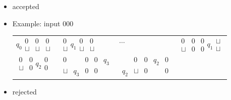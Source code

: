 \begin{frame}[allowframebreaks]
\begin{itemize}
\item [] accepted
  
\item Example: input 000

\renewcommand{\arraystretch}{1.7}  
  \begin{tabular}{llll}
$ q_0
\begin{smallmatrix}
  0 &0 & 0 \\
  \sqcup & \sqcup & \sqcup 
\end{smallmatrix}
$
&
$
\begin{smallmatrix}
  0 \\
  \sqcup 
\end{smallmatrix}
q_1
\begin{smallmatrix}
  0 & 0  \\
  \sqcup & \sqcup 
\end{smallmatrix}
$
&           
$\cdots
$
&
$
\begin{smallmatrix}
  0 & 0 & 0 \\
  \sqcup & 0  & 0 
\end{smallmatrix}
q_1
\begin{smallmatrix}
  \sqcup\\
  \sqcup 
\end{smallmatrix}
$
\\
$
\begin{smallmatrix}
  0 & 0  \\
  \sqcup  & 0 
\end{smallmatrix}
q_2
\begin{smallmatrix}
  0\\
  0
\end{smallmatrix}
$
&
$
\begin{smallmatrix}
  0 & & 0 & 0 & q_3\\
  \sqcup & q_3 & 0 & 0 &
\end{smallmatrix}
$
& 
$
\begin{smallmatrix}
  & 0  &  0 & q_2 & 0\\
  q_2 & \sqcup & 0 &  & 0 
\end{smallmatrix}
$
&
\end{tabular}
\renewcommand{\arraystretch}{1}

\item [] rejected

\end{itemize}

\end{frame}




